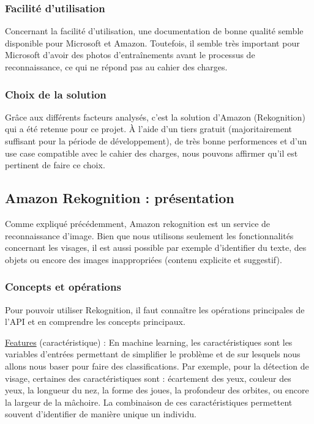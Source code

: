\subsubsection{Facilité d’utilisation}
Concernant la facilité d’utilisation, une documentation de bonne qualité semble disponible pour Microsoft et
Amazon. Toutefois, il semble très important pour Microsoft d’avoir des photos d’entraînements avant le processus
de reconnaissance, ce qui ne répond pas au cahier des charges.

\subsubsection{Choix de la solution}
Grâce aux différents facteurs analysés, c’est la solution d’Amazon (Rekognition) qui a été retenue pour ce projet. À
l’aide d’un tiers gratuit (majoritairement suffisant pour la période de développement), de très bonne performences
et d’un use case compatible avec le cahier des charges, nous pouvons affirmer qu’il est pertinent de faire ce choix.

\subsection{Amazon Rekognition : présentation}
Comme expliqué précédemment, Amazon rekognition est un service de reconnaissance d’image. Bien que nous
utilisons seulement les fonctionnalités concernant les visages, il est aussi possible par exemple d’identifier du texte,
des objets ou encore des images inappropriées (contenu explicite et suggestif).

\subsubsection{Concepts et opérations}
Pour pouvoir utiliser Rekognition, il faut connaître les opérations principales de l’API et en comprendre les concepts
principaux.

\underline{Features} (caractéristique) : En machine learning, les caractéristiques sont les variables d’entrées permettant de
simplifier le problème et de sur lesquels nous allons nous baser pour faire des classifications. Par exemple, pour la
détection de visage, certaines des caractéristiques sont : écartement des yeux, couleur des yeux, la longueur du
nez, la forme des joues, la profondeur des orbites, ou encore la largeur de la mâchoire. La combinaison de ces
caractéristiques permettent souvent d’identifier de manière unique un individu.

